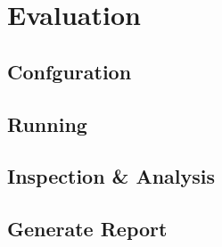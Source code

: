 \chapter{Evaluation}
\label{sec:eval} 

\section{Confguration}
\label{sec:eval_config} 

\section{Running}
\label{sec:eval_run} 

\section{Inspection \& Analysis}
\label{sec:eval_inspect} 

\section{Generate Report}
\label{sec:eval_report}
